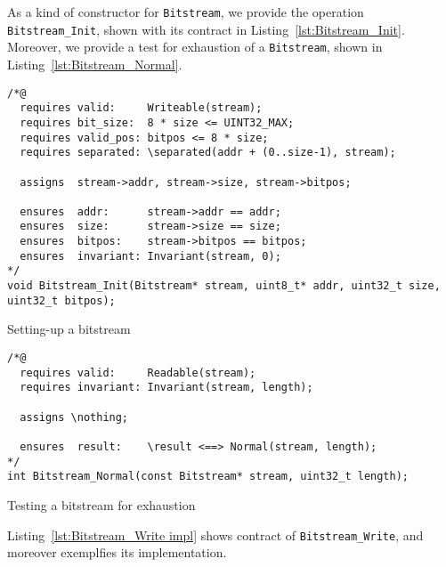 As a kind of constructor for
\lstinline{Bitstream}, we provide the operation \lstinline{Bitstream_Init},
shown with its contract in Listing~\ref{lst:Bitstream_Init}.
%
Moreover, we provide a test for exhaustion of a \lstinline{Bitstream},
shown in Listing~\ref{lst:Bitstream_Normal}.




\begin{listing}[hbt]
\begin{minipage}{0.99\textwidth}
\begin{lstlisting}[style=acsl-block]
/*@
  requires valid:     Writeable(stream);
  requires bit_size:  8 * size <= UINT32_MAX;
  requires valid_pos: bitpos <= 8 * size;
  requires separated: \separated(addr + (0..size-1), stream);

  assigns  stream->addr, stream->size, stream->bitpos;

  ensures  addr:      stream->addr == addr;
  ensures  size:      stream->size == size;
  ensures  bitpos:    stream->bitpos == bitpos;
  ensures  invariant: Invariant(stream, 0);
*/
void Bitstream_Init(Bitstream* stream, uint8_t* addr, uint32_t size, uint32_t bitpos);
\end{lstlisting}
\end{minipage}
\caption{\label{lst:Bitstream_Init}Setting-up a bitstream}
\end{listing}



\begin{listing}[hbt]
\begin{minipage}{0.99\textwidth}
\begin{lstlisting}[style=acsl-block]
/*@
  requires valid:     Readable(stream);
  requires invariant: Invariant(stream, length);

  assigns \nothing;

  ensures  result:    \result <==> Normal(stream, length);
*/
int Bitstream_Normal(const Bitstream* stream, uint32_t length);
\end{lstlisting}
\end{minipage}
\caption{\label{lst:Bitstream_Normal}Testing a bitstream for exhaustion}
\end{listing}





Listing~\ref{lst:Bitstream_Write impl} shows contract of
\lstinline{Bitstream_Write}, and moreover exemplfies its implementation.

